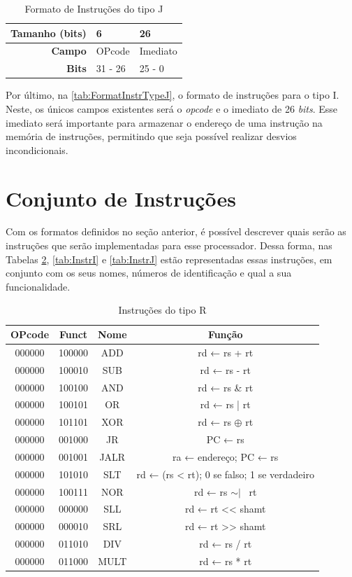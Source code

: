 \documentclass[
	12pt,				%
	oneside,
	a4paper,			%
	english,			%
	french,				%
	spanish,			%
	brazil,				%
	]{abntex2}
\begin{document}
\begin{table}[H]
\centering
\ABNTEXfontereduzida
\caption{Formato de Instruções do tipo J} \label{tab:FormatInstrTypeJ}
\begin{tabular}{r|p{1.7cm}|p{1.7cm}} 
\textbf{Tamanho (bits)} & 6 & 26 \\ \hline
\textbf{Campo} & OPcode & Imediato \\ \hline
\textbf{Bits} & 31 - 26 & 25 - 0\\
\end{tabular}
\end{table}

Por último, na \autoref{tab:FormatInstrTypeJ}, o formato de instruções para o tipo I. Neste, os únicos campos existentes será o \emph{opcode} e o imediato de 26 \emph{bits}. Esse imediato será importante para armazenar o endereço de uma instrução na memória de instruções, permitindo que seja possível realizar desvios incondicionais.

\section{Conjunto de Instruções}
Com os formatos definidos no seção anterior, é possível descrever quais serão as instruções que serão implementadas para esse processador. Dessa forma, nas Tabelas \ref{tab:InstrR}, \ref{tab:InstrI} e \ref{tab:InstrJ} estão representadas essas instruções, em conjunto com os seus nomes, números de identificação e qual a sua funcionalidade.


\begin{table}[H]
\centering
\ABNTEXfontereduzida
\caption{Instruções do tipo R} \label{tab:InstrR}
\begin{tabular}{||c c c c||} 
 \hline
 OPcode & Funct & Nome & Função \\ [0.5ex] 
 \hline\hline
 000000 & 100000 & ADD & rd ← rs + rt \\ 
 \hline
 000000 & 100010 & SUB & rd ← rs - rt \\
 \hline
 000000 & 100100 & AND & rd ← rs \& rt \\
 \hline
 000000 & 100101 & OR & rd ← rs | rt \\
 \hline
 000000 & 101101 & XOR & rd ← rs $\oplus$ rt \\
 \hline
 000000 & 001000 & JR & PC ← rs  \\  
 \hline
 000000 & 001001 & JALR & ra ← endereço; PC ← rs \\  
 \hline
 000000 & 101010 & SLT & rd ← (rs < rt); 0 se falso; 1 se verdadeiro\\  
 \hline
 000000 & 100111 & NOR & rd ← rs $\sim|$ \  rt \\
 \hline
 000000 & 000000 & SLL & rd ← rt << shamt \\ 
 \hline
 000000 & 000010 & SRL & rd ← rt >> shamt \\
 \hline
 000000 & 011010 & DIV & rd ← rs / rt \\
 \hline
 000000 & 011000 & MULT & rd ← rs * rt \\
 \hline
\end{tabular}
\end{table}
\end{document}
